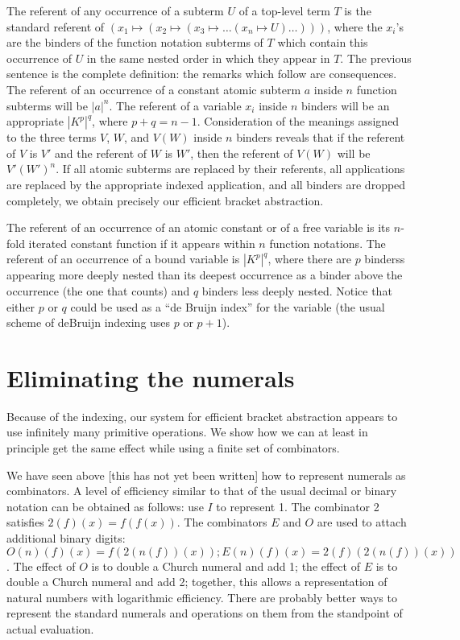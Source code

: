 \documentclass{article}
\begin{document}
The referent of any occurrence of a subterm $U$ of a top-level term
$T$ is the standard referent of $(x_1 \mapsto(x_2 \mapsto (x_3
\mapsto\ldots(x_n \mapsto U )\ldots)))$, where the $x_i$'s are the
binders of the function notation subterms of $T$ which contain this
occurrence of $U$ in the same nested order in which they appear in
$T$.  The previous sentence is the complete definition: the remarks
which follow are consequences.  The referent of an occurrence of a
constant atomic subterm $a$ inside $n$ function subterms will be
$|a|^n$.  The referent of a variable $x_i$ inside $n$ binders will be
an appropriate $|K^p|^q$, where $p+q=n-1$.  Consideration of the
meanings assigned to the three terms $V$, $W$, and $V(W)$ inside $n$
binders reveals that if the referent of $V$ is $V'$ and the referent
of $W$ is $W'$, then the referent of $V(W)$ will be $V'(W')^n$.  If
all atomic subterms are replaced by their referents, all applications
are replaced by the appropriate indexed application, and all binders
are dropped completely, we obtain precisely our efficient bracket
abstraction.

The referent of an occurrence of an atomic constant or of a free
variable is its $n$-fold iterated constant function if it appears
within $n$ function notations.  The referent of an occurrence of a
bound variable is $|K^p|^q$, where there are $p$ binderss appearing
more deeply nested than its deepest occurrence as a binder above the
occurrence (the one that counts) and $q$ binders less deeply nested.
Notice that either $p$ or $q$ could be used as a ``de Bruijn index''
for the variable (the usual scheme of deBruijn indexing uses $p$ or
$p+1$).

\section{Eliminating the numerals}

Because of the indexing, our system for efficient bracket abstraction
appears to use infinitely many primitive operations.  We show how we
can at least in principle get the same effect while using a finite set
of combinators.

We have seen above [this has not yet been written] how to represent
numerals as combinators.  A level of efficiency similar to that of the
usual decimal or binary notation can be obtained as follows: use $I$
to represent 1.  The combinator 2 satisfies $2(f)(x)=f(f(x))$.  The
combinators $E$ and $O$ are used to attach additional binary digits:
$O(n)(f)(x) = f(2(n(f))(x)); E(n)(f)(x) = 2(f)(2(n(f))(x))$.  The
effect of $O$ is to double a Church numeral and add 1; the effect of
$E$ is to double a Church numeral and add 2; together, this allows a
representation of natural numbers with logarithmic efficiency.  There
are probably better ways to represent the standard numerals and
operations on them from the standpoint of actual evaluation.
\end{document}
